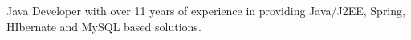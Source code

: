 

\begin{cvparagraph}

    Java Developer with over 11 years of experience in providing Java/J2EE, Spring, HIbernate and MySQL based solutions.
\end{cvparagraph}
